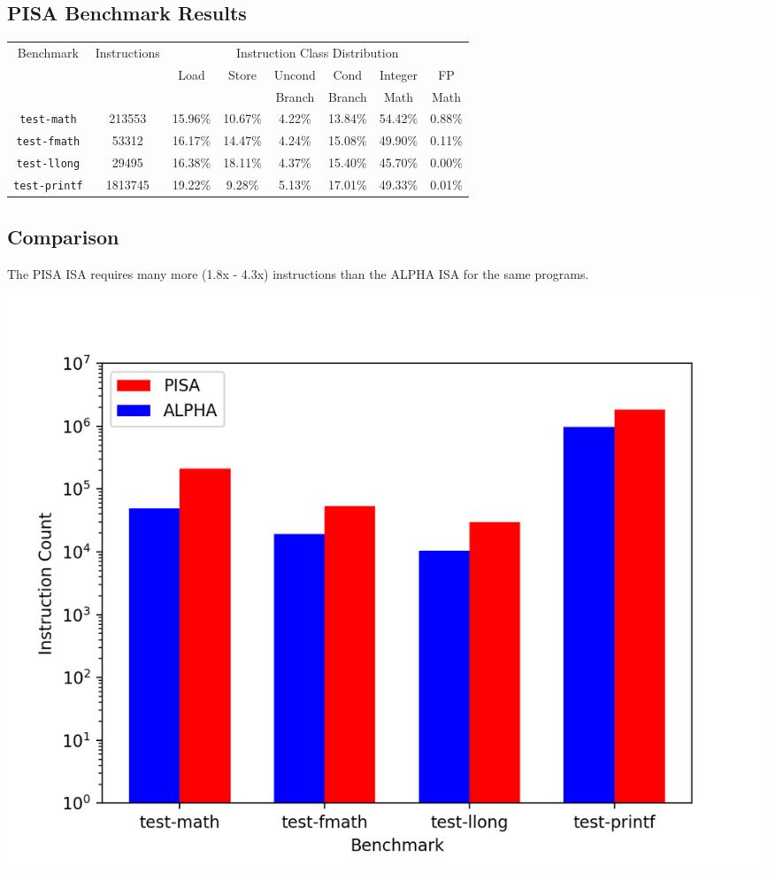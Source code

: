 \documentclass[11pt]{article}
\begin{document}
\subsection{PISA Benchmark Results}
\label{sec:orga30ce2a}
\begin{center}
\begin{tabular}{|c|c|c|c|c|c|c|c|}
  \hline
  \multirow{3}{*}{Benchmark} & \multirow{3}{*}{Instructions} & \multicolumn{6}{c|}{Instruction Class Distribution} \\ \cline{3-8}
  & & \multirow{2}{*}{Load} & \multirow{2}{*}{Store} & Uncond & Cond   & Integer  & FP\\
  & &                       &                        & Branch & Branch & Math     & Math \\
  \hline
  \texttt{test-math} & 213553 & 15.96\% & 10.67\% & 4.22\% & 13.84\% & 54.42\% & 0.88\% \\
  \texttt{test-fmath} & 53312 & 16.17\% & 14.47\% & 4.24\% & 15.08\% & 49.90\% & 0.11\% \\
  \texttt{test-llong} & 29495 & 16.38\% & 18.11\% & 4.37\% & 15.40\% & 45.70\% & 0.00\% \\
  \texttt{test-printf} & 1813745 & 19.22\% & 9.28\% & 5.13\% & 17.01\% & 49.33\% & 0.01\% \\
  \hline
\end{tabular}
\end{center}

\subsection{Comparison}
\label{sec:org474c407}
The PISA ISA requires many more (1.8x - 4.3x) instructions than the \mbox{ALPHA} ISA for the same programs.

\begin{center}
\includegraphics[width=.9\linewidth]{./bar_comparison.png}
\end{center}
\end{document}
